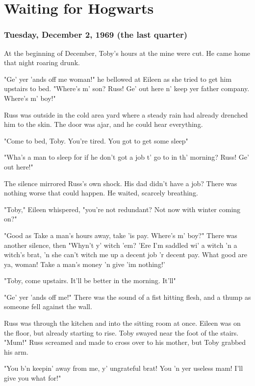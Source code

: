 
\chapter{Waiting for Hogwarts}

\subsection{Tuesday, December 2, 1969 (the last quarter)}

At the beginning of December, Toby's hours at the mine were cut. He came home that night roaring drunk.

"Ge' yer 'ands off me woman!" he bellowed at Eileen as she tried to get him upstairs to bed. "Where's m' son? Russ! Ge' out here n' keep yer father company. Where's m' boy!"

Russ was outside in the cold area yard where a steady rain had already drenched him to the skin. The door was ajar, and he could hear everything.

"Come to bed, Toby. You're tired. You got to get some sleep{\el}"

"Wha's a man to sleep for if he don't got a job t' go to in th' morning? Russ! Ge' out here!"

The silence mirrored Russ's own shock. His dad didn't have a job? There was nothing worse that could happen. He waited, scarcely breathing.

"Toby," Eileen whispered, "you're not redundant? Not now with winter coming on?"

"Good as{\el} Take a man's hours away, take 'is pay. Where's m' boy?" There was another silence, then{\el} "Whyn't y' witch 'em? 'Ere I'm saddled wi' a witch 'n a witch's brat, 'n she can't witch me up a decent job 'r decent pay. What good are ya, woman! Take a man's money 'n give 'im nothing!'

"Toby, come upstairs. It'll be better in the morning. It'll{\el}"

"Ge' yer 'ands off me!" There was the sound of a fist hitting flesh, and a thump as someone fell against the wall.

Russ was through the kitchen and into the sitting room at once. Eileen was on the floor, but already starting to rise. Toby swayed near the foot of the stairs. "Mum!" Russ screamed and made to cross over to his mother, but Toby grabbed his arm.

"You b'n keepin' away from me, y' ungrateful brat! You 'n yer useless mam! I'll give you what for!"

